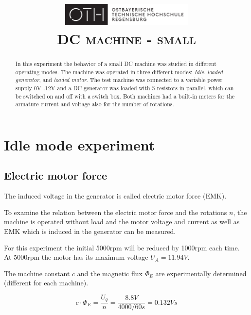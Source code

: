 \documentclass[conference]{IEEEtran}
\author{
    \IEEEauthorblockN{
        \textsc{Ayham Alhalaibi}
    }
    \and
    \IEEEauthorblockN{
        \textsc{Julia Blechle}
    }
    \and
    \IEEEauthorblockN{
        \textsc{Clara Huber}
    }
}
\begin{document}
\title{
    \centering
    \includegraphics[width=0.5\textwidth]{../OTHR_OTHR_Logo.pdf}\\
    \textsc{DC machine - small} \\
}

\maketitle

\begin{abstract}

    In this experiment the behavior of a small DC machine was studied in
    different operating modes. The machine was operated in three different
    modes: \textit{Idle}, \textit{loaded generator}, and \textit{loaded motor}.
    The test machine was connected to a variable power supply
    0\si{V}\dots12\si{V} and a DC generator was loaded with 5 resistors in
    parallel, which can be switched on and off with a switch box. Both machines
    had a built-in meters for the armature current and voltage also for the
    number of rotations.

\end{abstract}

\section{Idle mode experiment}
\subsection{Electric motor force}

The induced voltage in the generator is called electric motor force
($\mathrm{EMK}$).

To examine the relation between the electric motor force and the rotations $n$,
the machine is operated without load and the motor voltage and current as well
as $\mathrm{EMK}$ which is induced in the generator can be measured.

For this experiment the initial 5000rpm will be reduced by 1000rpm each
time. At 5000rpm the motor has its maximum voltage $U_A = 11.94V$.

The machine constant $c$ and the magnetic flux $\Phi_E$ are experimentally
determined (different for each machine).

\begin{equation} \label{eq:machine_const}
    c \cdot \Phi_E = \frac{U_q}{n} = \frac{8.8\si{V}}{4000/60\si{s}} = 0.132\si{Vs}
\end{equation}
\end{document}

